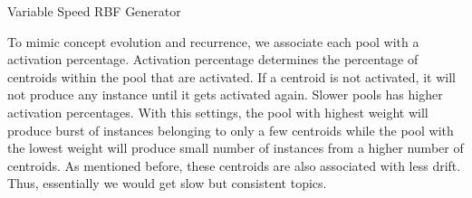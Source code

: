 \begin{algorithm}[htbp]
    \caption{Variable Speed RBF Generator}
    \label{alg:vsrbf}
    \DontPrintSemicolon
      
    
    
\end{algorithm}

To mimic concept evolution and recurrence, we associate each pool with a activation percentage. Activation percentage determines the percentage of centroids within the pool that are activated. If a centroid is not activated, it will not produce any instance until it gets activated again. Slower pools has higher activation percentages. With this settings, the pool with highest weight will produce burst of instances belonging to only a few centroids while the pool with the lowest weight will produce small number of instances from a higher number of centroids. As mentioned before, these centroids are also associated with less drift. Thus, essentially we would get slow but consistent topics.


